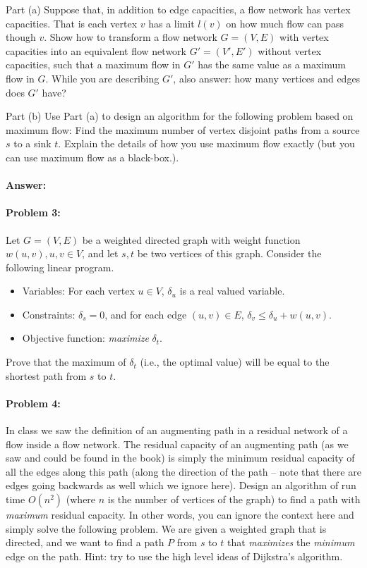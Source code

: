 \documentclass{article}
\begin{document}
Part (a) Suppose that, in addition to edge capacities, a flow network has vertex capacities.
That is each vertex $v$ has a limit $l(v)$ on how much flow can pass though $v$. Show
how to transform a flow network $G=(V,E)$ with vertex capacities into an equivalent
flow network $G'=(V',E')$ without vertex capacities, such that a maximum flow in $G'$ has the same value as a maximum flow in $G$. While you are describing $G'$, also answer: how many vertices and edges does $G'$ have?

Part (b) Use Part (a) to design an algorithm for the following problem based on maximum flow: Find the maximum number of vertex disjoint paths from a source $s$ to a sink $t$. Explain the details of how you use maximum flow exactly (but you can use maximum flow as a black-box.).
\paragraph{Answer:}


\newpage
\paragraph{Problem 3:} 
Let $G=(V,E)$ be a weighted directed graph with weight function $w(u,v), u,v \in V$, and let $s,t$ be two vertices of this graph. Consider the following linear program.
\begin{itemize}
    \item Variables: For each vertex $u \in V$, $\delta_u$ is a real valued variable.
    \item Constraints: $\delta_s=0$, and for each edge $(u,v) \in E$, $\delta_v \leq \delta_u + w(u,v)$.
    \item Objective function: \emph{maximize} $\delta_t$.
\end{itemize}
Prove that the maximum of $\delta_t$ (i.e., the optimal value) will be equal to the shortest path from $s$ to $t.$

\newpage
\paragraph{Problem 4:} 
In class we saw the definition of an augmenting path in a residual network of a flow inside a flow network. The residual capacity of an augmenting path (as we saw and could be found in the book) is simply the minimum residual capacity of all the edges along this path (along the direction of the path -- note that there are edges going backwards as well which we ignore here). Design an algorithm of run time $O(n^2)$ (where $n$ is the number of vertices of the graph) to find a path with \emph{maximum} residual capacity. In other words, you can ignore the context here and simply solve the following problem. We are given a weighted graph that is directed, and we want to find a path $P$ from $s$ to $t$ that \emph{maximizes} the \emph{minimum} edge on the path. Hint: try to use the high level ideas of Dijkstra's algorithm.
\end{document}
